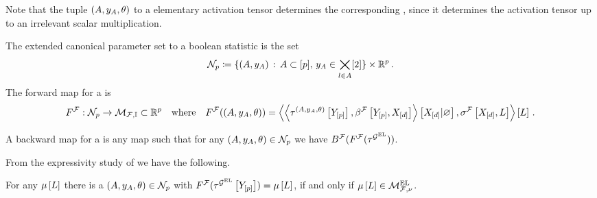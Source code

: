 Note that the tuple $(A,y_{A},\theta)$ to a elementary activation tensor determines the corresponding \HybridLogicNetwork{}, since it determines the activation tensor up to an irrelevant scalar multiplication.



\begin{definition}
    The extended canonical parameter set to a boolean statistic is the set
    \begin{align*}
        \mathcal{N}_{p}\coloneqq
        \{(A,y_{A})\,:\, A\subset[p],\, y_{A}\in\bigtimes_{l\in A}[2]\} \times \mathbb{R}^{p} \, .
    \end{align*}
    The forward map for a \HybridLogicNetwork{} is
    \begin{align*}
        F^{\mathcal{F}} :  \mathcal{N}_{p}
        \rightarrow \mathcal{M}_{\mathcal{F},\mathbb{I}} \subset \mathbb{R}^{p}
        \quad \text{where} \quad
        F^{\mathcal{F}}((A,y_{A},\theta))
        = \left\langle 
            \left\langle \tau^{(A,y_{A},\theta)}\left[Y_{[p]}\right],\beta^{\mathcal{F}}\left[Y_{[p]},X_{[d]}\right]\right\rangle \left[ X_{[d]} | \varnothing \right]
            ,\sigma^{\mathcal{F}}\left[X_{[d]},L\right]\right\rangle \left[ L \right] \, .
    \end{align*}

    A backward map for a \HybridLogicNetwork{} is any map
    such that for any $(A,y_{A},\theta)\in\mathcal{N}_{p}$ we have $B^{\mathcal{F}}(F^{\mathcal{F}}(\tau^{\mathcal{G}^{\mathrm{EL}}}))$.

\end{definition}

From the expressivity study of  we have the following.

For any $\mu\left[L\right]$ there is a $(A,y_{A},\theta)\in\mathcal{N}_{p}$ with $F^{\mathcal{F}}(\tau^{\mathcal{G}^{\mathrm{EL}}}\left[Y_{[p]}\right])=\mu\left[L\right]$, if and only if $\mu\left[L\right]\in\mathcal{M}^{\mathrm{EL}}_{\mathcal{F},\nu}$.

